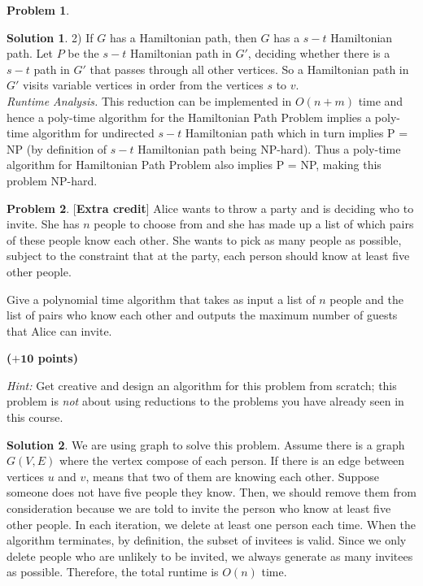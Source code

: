 \documentclass{article}
\theoremstyle{definition}
\newtheorem{problem}{Problem}
\newtheorem*{solution*}{Solution}
\newenvironment{solution}{\begin{solution*}}{{} \end{solution*}}
\newcommand{\grade}[1]{\hfill{\textbf{($\mathbf{#1}$ points)}}}
\begin{document}
\begin{problem}
\begin{enumerate}[label=(\alph*)]
\begin{solution}
		2)  If $G$ has a Hamiltonian path, then $G$ has a $s-t$ Hamiltonian path. Let $P$ be the $s-t$ Hamiltonian path in $G'$, deciding whether there is a $s-t$ path in $G'$ that passes through all other vertices. So a Hamiltonian path in $G'$ visits variable vertices in order from the vertices $s$ to $v$. \\
		
		\emph{Runtime Analysis.} This  reduction  can  be  implemented  in $O(n+m)$  time  and  hence  a  poly-time algorithm for the Hamiltonian Path Problem implies  a  poly-time  algorithm  for  undirected $s-t$ Hamiltonian path which in turn implies P = NP (by definition of $s-t$ Hamiltonian path being NP-hard).  Thus a poly-time algorithm for Hamiltonian Path Problem also implies P = NP, making this problem NP-hard.		
		\end{solution}
		
	\end{enumerate}
\end{problem}

\newpage

\begin{problem}\label{extra}[\textbf{Extra credit}]
	Alice wants to throw a party and is deciding who to invite. She has $n$ people to choose from
and she has made up a list of which pairs of these people know each other. She wants to pick as many people as 
possible, subject to the constraint that at the party, each person should know at least five other people.

Give a polynomial time algorithm that takes as input a list of $n$ people and the list of pairs who know 
each other and outputs the maximum number of guests that Alice can invite. 

	 \grade{+10}
	 
\medskip
\emph{Hint:} Get creative and design an algorithm for this problem from scratch; this problem is \emph{not} about using  reductions to the problems you have already seen in this course. 
\end{problem}

	\medskip
		\begin{solution}
		
		We are using graph to solve this problem. Assume there is a graph $G(V,E)$ where the vertex compose of each person. If there is an edge between vertices $u$ and $v$, means that two of them are knowing each other. Suppose someone does not have five people they know. Then, we should remove them from consideration because we are told to invite the person who know at least five other people. In each iteration, we delete at least one person each time. When the algorithm terminates, by definition, the subset of invitees is valid. Since we only delete people who are unlikely to be invited, we always generate as many invitees as possible. Therefore, the total runtime is $O(n)$ time.		
		\end{solution}
		
\end{document}
